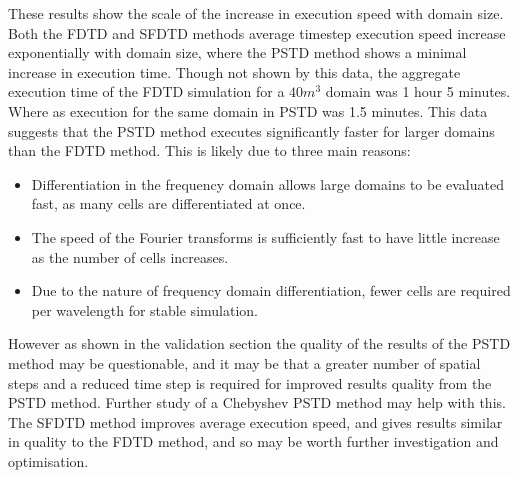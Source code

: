 These results show the scale of the increase in execution speed with domain size. Both the FDTD and SFDTD methods average timestep execution speed increase exponentially with domain size, where the PSTD method shows a minimal increase in execution time. Though not shown by this data, the aggregate execution time of the FDTD simulation for a $40m^3$ domain was 1 hour 5 minutes. Where as execution for the same domain in PSTD was 1.5 minutes. This data suggests that the PSTD method executes significantly faster for larger domains than the FDTD method. This is likely due to three main reasons: \\
\begin{itemize}
\item Differentiation in the frequency domain allows large domains to be evaluated fast, as many cells are differentiated at once.
\item The speed of the Fourier transforms is sufficiently fast to have little increase as the number of cells increases. 
\item Due to the nature of frequency domain differentiation, fewer cells are required per wavelength for stable simulation.
\end{itemize}
However as shown in the validation section the quality of the results of the PSTD method may be questionable, and it may be that a greater number of spatial steps and a reduced time step is required for improved results quality from the PSTD method. Further study of a Chebyshev PSTD method may help with this. The SFDTD method improves average execution speed, and gives results similar in quality to the FDTD method, and so may be worth further investigation and optimisation.
